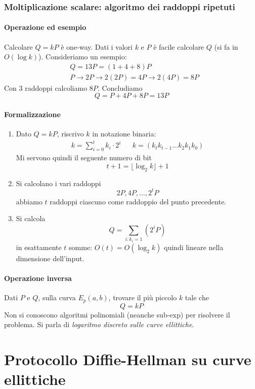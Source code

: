 \subsubsection{Moltiplicazione scalare: algoritmo dei raddoppi ripetuti}
\paragraph{Operazione ed esempio} Calcolare $Q = kP$ è one-way. Dati i valori $k$ e $P$ è facile calcolare $Q$ (si fa in $O(\log k)$). Consideriamo un esempio:
\begin{align*}
	&Q=13P=(1+4+8)P\\
	&P \longrightarrow 2P \longrightarrow 2(2P)=4P \longrightarrow 2(4P)=8P
\end{align*}
Con 3 raddoppi calcoliamo $8P$. Concludiamo
$$Q=P+4P+8P=13P$$

\paragraph{Formalizzazione} 
\begin{enumerate}
	\item Dato $Q = kP$, riscrivo $k$ in notazione binaria: 
	\begin{align*}
		k = \sum_{i=0}^{t}k_i \cdot 2^i && k=(k_tk_{t-1}\dots k_2k_1k_0)
	\end{align*}
	Mi servono quindi il seguente numero di bit
	$$t+1 = \lfloor \log_2 k \rfloor + 1$$
	\item Si calcolano i vari raddoppi $$2P, 4P, \dots, 2^tP$$
	abbiamo $t$ raddoppi ciascuno come raddoppio del punto precedente.
	\item Si calcola $$Q = \sum_{i : k_i = 1} (2^iP)$$ in esattamente $t$ somme: $O(t) = O(\log_2 k)$ quindi lineare nella dimensione dell'input.
\end{enumerate}


\paragraph{Operazione inversa} Dati $P$ e $Q$, sulla curva $E_p(a,b)$, trovare il più piccolo $k$ tale che$$Q = kP$$
Non si conoscono algoritmi polinomiali (neanche  sub-exp) per risolvere il problema. Si parla di \emph{logaritmo discreto sulle curve ellittiche}.

\section{Protocollo Diffie-Hellman su curve ellittiche}
